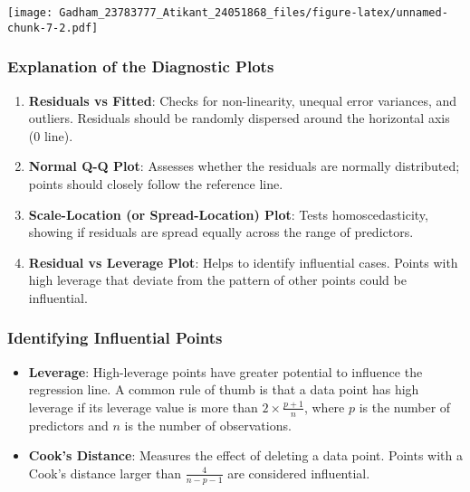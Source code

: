 \documentclass[
]{article}
\providecommand{\tightlist}{%
  \setlength{\itemsep}{0pt}\setlength{\parskip}{0pt}}
\begin{document}
\texttt{[image: Gadham\_23783777\_Atikant\_24051868\_files/figure-latex/unnamed-chunk-7-2.pdf]}

\hypertarget{explanation-of-the-diagnostic-plots}{%
\subsubsection{Explanation of the Diagnostic
Plots}\label{explanation-of-the-diagnostic-plots}}

\begin{enumerate}
\def\labelenumi{\arabic{enumi}.}
\tightlist
\item
  \textbf{Residuals vs Fitted}: Checks for non-linearity, unequal error
  variances, and outliers. Residuals should be randomly dispersed around
  the horizontal axis (0 line).
\item
  \textbf{Normal Q-Q Plot}: Assesses whether the residuals are normally
  distributed; points should closely follow the reference line.
\item
  \textbf{Scale-Location (or Spread-Location) Plot}: Tests
  homoscedasticity, showing if residuals are spread equally across the
  range of predictors.
\item
  \textbf{Residual vs Leverage Plot}: Helps to identify influential
  cases. Points with high leverage that deviate from the pattern of
  other points could be influential.
\end{enumerate}

\hypertarget{identifying-influential-points}{%
\subsubsection{Identifying Influential
Points}\label{identifying-influential-points}}

\begin{itemize}
\tightlist
\item
  \textbf{Leverage}: High-leverage points have greater potential to
  influence the regression line. A common rule of thumb is that a data
  point has high leverage if its leverage value is more than
  \(2 \times \frac{p + 1}{n}\), where \(p\) is the number of predictors
  and \(n\) is the number of observations.
\item
  \textbf{Cook's Distance}: Measures the effect of deleting a data
  point. Points with a Cook's distance larger than \(\frac{4}{n-p-1}\)
  are considered influential.
\end{itemize}
\end{document}
